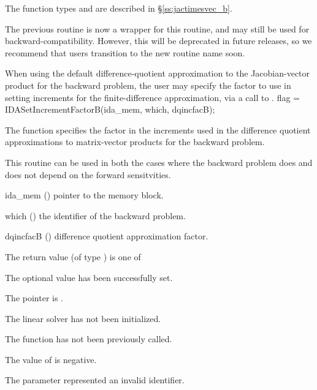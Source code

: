 {
  The function types  and
   are described in
  \S\ref{ss:jactimesvec_b}.

  The previous routine  is now a wrapper for this
  routine, and may still be used for backward-compatibility.  However,
  this will be deprecated in future releases, so we recommend that
  users transition to the new routine name soon.
}
When using the default difference-quotient approximation to the Jacobian-vector
product for the backward problem, the user may specify the factor to use in
setting increments for the finite-difference approximation, via a call to
.
{
  flag = IDASetIncrementFactorB(ida\_mem, which, dqincfacB);
}
{
  The function  specifies the factor
  in the increments used in the difference quotient approximations to matrix-vector
  products for the backward problem.

  This routine can be used in both the cases where the backward problem
  does and does not depend on the forward sensitvities.
}
{
  \begin{args}
  \item[ida\_mem] ()
    pointer to the {\idas} memory block.
  \item[which] ()
    the identifier of the backward problem.
  \item[dqincfacB] ()
    difference quotient approximation factor.
  \end{args}
}
{
  The return value  (of type ) is one of
  \begin{args}
  \item[\Id{IDALS\_SUCCESS}]
    The optional value has been successfully set.
  \item[\Id{IDALS\_MEM\_NULL}]
    The  pointer is .
  \item[\Id{IDALS\_LMEM\_NULL}]
    The {\idals} linear solver has not been initialized.
  \item[\Id{IDALS\_NO\_ADJ}]
    The function  has not been previously called.
  \item[\Id{IDALS\_ILL\_INPUT}]
    The value of  is negative.
  \item[\Id{IDALS\_ILL\_INPUT}]
    The parameter  represented an invalid identifier.
  \end{args}
}
